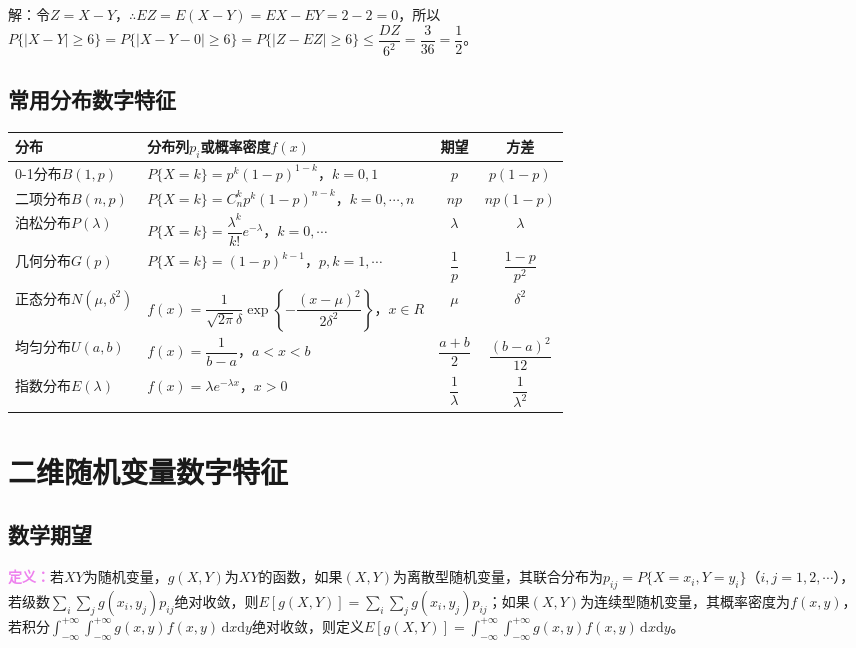 \documentclass[UTF8, 12pt]{ctexart}
\begin{document}
解：令$Z=X-Y$，$\therefore EZ=E(X-Y)=EX-EY=2-2=0$，所以$P\{\vert X-Y\vert\geqslant6\}=P\{\vert X-Y-0\vert\geqslant6\}=P\{\vert Z-EZ\vert\geqslant6\}\leqslant\dfrac{DZ}{6^2}=\dfrac{3}{36}=\dfrac{1}{2}$。

\subsection{常用分布数字特征}

\begin{center}
    \begin{tabular}{|m{50pt}<{\centering}|m{220pt}<{\centering}|c|c|}
        \hline
        分布 & 分布列$p_i$或概率密度$f(x)$ & 期望 & 方差 \\ \hline
        0-1分布$B(1,p)$ & $P\{X=k\}=p^k(1-p)^{1-k}$，$k=0,1$ & $p$ & $p(1-p)$ \\ \hline
        二项分布$B(n,p)$ & $P\{X=k\}=C_n^kp^k(1-p)^{n-k}$，$k=0,\cdots,n$ & $np$ & $np(1-p)$ \\ \hline
        泊松分布$P(\lambda)$ & $P\{X=k\}=\dfrac{\lambda^k}{k!}e^{-\lambda}$，$k=0,\cdots$ & $\lambda$ & $\lambda$ \\ \hline
        几何分布$G(p)$ & $P\{X=k\}=(1-p)^{k-1}$，$p,k=1,\cdots$ & $\dfrac{1}{p}$ & $\dfrac{1-p}{p^2}$ \\ \hline
        正态分布$N(\mu,\delta^2)$ & $f(x)=\dfrac{1}{\sqrt{2\pi}\delta}\exp\left\{-\dfrac{(x-\mu)^2}{2\delta^2}\right\}$，$x\in R$ & $\mu$ & $\delta^2$ \\ \hline
        均匀分布$U(a,b)$ & $f(x)=\dfrac{1}{b-a}$，$a<x<b$ & $\dfrac{a+b}{2}$ & $\dfrac{(b-a)^2}{12}$ \\ \hline
        指数分布$E(\lambda)$ & $f(x)=\lambda e^{-\lambda x}$，$x>0$ & $\dfrac{1}{\lambda}$ & $\dfrac{1}{\lambda^2}$ \\ \hline
    \end{tabular}
\end{center}

\section{二维随机变量数字特征}

\subsection{数学期望}

\textcolor{violet}{\textbf{定义：}}若$XY$为随机变量，$g(X,Y)$为$XY$的函数，如果$(X,Y)$为离散型随机变量，其联合分布为$p_{ij}=P\{X=x_i,Y=y_i\}$（$i,j=1,2,\cdots$），若级数$\sum\limits_i\sum\limits_jg(x_i,y_j)p_{ij}$绝对收敛，则$E[g(X,Y)]=\sum\limits_i\sum\limits_jg(x_i,y_j)p_{ij}$；如果$(X,Y)$为连续型随机变量，其概率密度为$f(x,y)$，若积分$\int_{-\infty}^{+\infty}\int_{-\infty}^{+\infty}g(x,y)f(x,y)\,\textrm{d}x\textrm{d}y$绝对收敛，则定义$E[g(X,Y)]=\int_{-\infty}^{+\infty}\int_{-\infty}^{+\infty}g(x,y)f(x,y)\,\textrm{d}x\textrm{d}y$。
\end{document}
